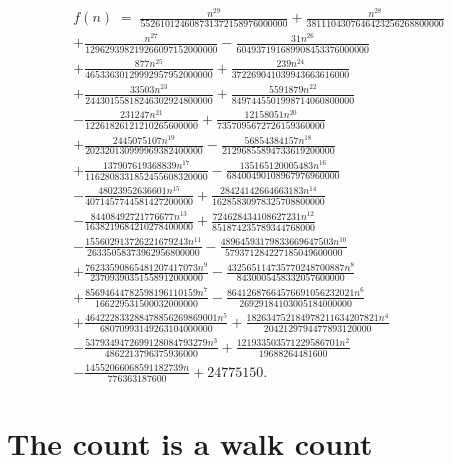 \documentclass[11pt,a4paper]{article}
\theoremstyle{plain}
\theoremstyle{definition}
\begin{document}
\begin{multline*}
f(n)\;=\;\frac{n^{29}}{552610124608731372158976000000} + \frac{n^{28}}{3811104307646423256268800000} \\
+ \frac{n^{27}}{129629398219266097152000000} - \frac{31 n^{26}}{604937191689908453376000000} \\
+ \frac{877 n^{25}}{46533630129992957952000000} + \frac{239 n^{24}}{372269041039943663616000} \\
+ \frac{33503 n^{23}}{24430155818246302924800000} + \frac{5591879 n^{22}}{8497445501998714060800000} \\
- \frac{231247 n^{21}}{12261826121210265600000} + \frac{12158051 n^{20}}{7357095672726159360000} \\
+ \frac{2445075107 n^{19}}{202320130999969382400000} - \frac{56854384157 n^{18}}{21296855894733619200000} \\
+ \frac{137907619368839 n^{17}}{1162808331852455608320000} - \frac{135165120005483 n^{16}}{68400490108967976960000} \\
- \frac{48023952636601 n^{15}}{4071457744581427200000} + \frac{28424142664663183 n^{14}}{16285830978325708800000} \\
- \frac{84408492721776677 n^{13}}{1638219684210278400000} + \frac{724628434108627231 n^{12}}{851874235789344768000} \\
- \frac{155602913726221679243 n^{11}}{26335058373962956800000} - \frac{48964593179833669647503 n^{10}}{579371284227185049600000} \\
+ \frac{76233590865481207417073 n^{9}}{23709390351558912000000} - \frac{432565114735770248700887 n^{8}}{8430005458332057600000} \\
+ \frac{85694644782598196110159 n^{7}}{166229531500032000000} - \frac{86412687664576691056232021 n^{6}}{26929184103005184000000} \\
+ \frac{464222833288478856269869001 n^{5}}{68070993149263104000000} + \frac{182634752184978211634207821 n^{4}}{2042129794477893120000} \\
- \frac{5379349472699128084793279 n^{3}}{4862213796375936000} + \frac{121933503571229586701 n^{2}}{19688264481600} \\
- \frac{14552066068591182739 n}{776363187600} + 24775150.
\end{multline*}

\section{The count is a walk count}
\end{document}
